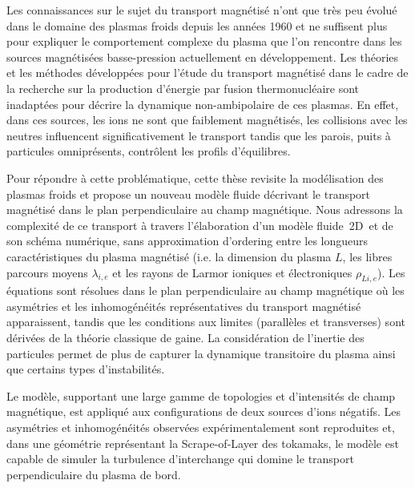 \ChapterStar{}
	\thispagestyle{empty}
	\newpage
	\thispagestyle{empty}
\vspace{90pt}
Les connaissances sur le sujet du transport magnétisé n'ont que très peu évolué
dans le domaine des plasmas froids depuis les années 1960 et ne suffisent plus
pour expliquer le comportement complexe du plasma que l'on
rencontre dans les sources magnétisées basse-pression actuellement en développement.
Les théories et les méthodes développées pour l'étude du transport magnétisé
dans le cadre de la recherche sur la production d'énergie par fusion
thermonucléaire sont inadaptées pour décrire la dynamique non-ambipolaire de ces
plasmas. En effet, dans ces sources, les ions ne sont que faiblement magnétisés,
les collisions avec les neutres influencent significativement le transport
tandis que les parois, puits à particules omniprésents, contrôlent les profils
d'équilibres.

Pour répondre à cette problématique, cette thèse revisite la modélisation
des plasmas froids et propose un nouveau modèle fluide décrivant le transport
magnétisé dans le plan perpendiculaire au champ magnétique.		
Nous adressons la complexité de ce transport à travers l’élaboration d'un modèle
fluide~2D\textonehalf ~et de son schéma numérique, sans approximation d'ordering
entre les longueurs caractéristiques du plasma magnétisé (i.e. la dimension du
plasma $L$, les libres parcours moyens $\lambda_{i,e}$ et les rayons
de Larmor ioniques et électroniques $\rho_{Li,e}$).
Les équations sont résolues dans le plan perpendiculaire au champ magnétique où
les asymétries et les inhomogénéités représentatives du transport magnétisé
apparaissent, tandis que les conditions aux limites (parallèles et transverses)
sont dérivées de la théorie classique de gaine. La considération de l'inertie
des particules permet de plus de capturer la dynamique transitoire du plasma
ainsi que certains types d'instabilités.
		
Le modèle, supportant une large gamme de topologies et d'intensités de champ
magnétique, est appliqué aux configurations de deux sources d'ions négatifs. 
Les asymétries et inhomogénéités observées expérimentalement sont reproduites
et, dans une géométrie représentant la Scrape-of-Layer des tokamaks, le modèle
est capable de simuler la turbulence d'interchange qui domine le transport
perpendiculaire du plasma de bord.	
